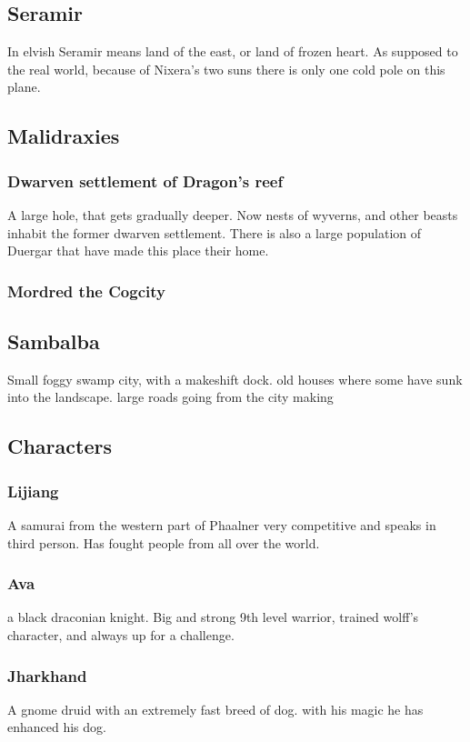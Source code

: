 \documentclass[a4paper]{article}
\begin{document}
\subsection{Seramir}
In elvish Seramir means land of the east, or land of frozen heart. As supposed to the real world, because of Nixera's two suns there is only one cold pole on this plane.

\subsection{Malidraxies}

\subsubsection{Dwarven settlement of Dragon's reef}
A large hole, that gets gradually deeper. Now nests of wyverns, and other beasts inhabit the former dwarven settlement. There is also a large population of Duergar that have made this place their home.

\subsubsection{Mordred the Cogcity}

\subsection{Sambalba}
Small foggy swamp city, with a makeshift dock. old houses where some have sunk into the landscape. large roads going from the city making  

\subsection{Characters}

\subsubsection{Lijiang}
A samurai from the western part of Phaalner very competitive and speaks in third person. Has fought people from all over the world.

\subsubsection{Ava}
a black draconian knight. Big and strong 9th level warrior, trained wolff's character, and always up for a challenge.

\subsubsection{Jharkhand}
A gnome druid with an extremely fast breed of dog. with his magic he has enhanced his dog.
\end{document}
